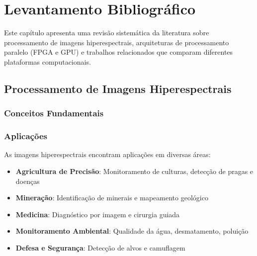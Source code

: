 \chapter{Levantamento Bibliográfico}\label{chp:levantamento}

Este capítulo apresenta uma revisão sistemática da literatura sobre processamento de imagens hiperespectrais, arquiteturas de processamento paralelo (FPGA e GPU) e trabalhos relacionados que comparam diferentes plataformas computacionais.

\section{Processamento de Imagens Hiperespectrais}\label{sec:proc_hiperespectral}

\subsection{Conceitos Fundamentais}

\subsection{Aplicações}
As imagens hiperespectrais encontram aplicações em diversas áreas:
\begin{itemize}
    \item \textbf{Agricultura de Precisão}: Monitoramento de culturas, detecção de pragas e doenças
    \item \textbf{Mineração}: Identificação de minerais e mapeamento geológico
    \item \textbf{Medicina}: Diagnóstico por imagem e cirurgia guiada
    \item \textbf{Monitoramento Ambiental}: Qualidade da água, desmatamento, poluição
    \item \textbf{Defesa e Segurança}: Detecção de alvos e camuflagem
\end{itemize}


